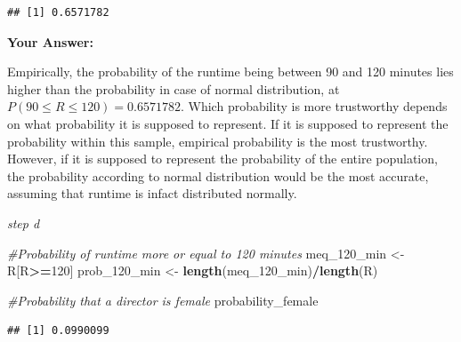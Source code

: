 \documentclass[
]{article}
\newenvironment{Shaded}{\begin{snugshade}}{\end{snugshade}}
\newcommand{\AttributeTok}[1]{\textcolor[rgb]{0.13,0.29,0.53}{#1}}
\newcommand{\CommentTok}[1]{\textcolor[rgb]{0.56,0.35,0.01}{\textit{#1}}}
\newcommand{\ConstantTok}[1]{\textcolor[rgb]{0.56,0.35,0.01}{#1}}
\newcommand{\DecValTok}[1]{\textcolor[rgb]{0.00,0.00,0.81}{#1}}
\newcommand{\FunctionTok}[1]{\textcolor[rgb]{0.13,0.29,0.53}{\textbf{#1}}}
\newcommand{\NormalTok}[1]{#1}
\newcommand{\OtherTok}[1]{\textcolor[rgb]{0.56,0.35,0.01}{#1}}
\newcommand{\SpecialCharTok}[1]{\textcolor[rgb]{0.81,0.36,0.00}{\textbf{#1}}}
\newcommand{\StringTok}[1]{\textcolor[rgb]{0.31,0.60,0.02}{#1}}
\begin{document}
\begin{verbatim}
## [1] 0.6571782
\end{verbatim}

\textbf{Your Answer:}

Empirically, the probability of the runtime being between 90 and 120
minutes lies higher than the probability in case of normal distribution,
at \(P(90 \leq R \leq 120)=0.6571782\). Which probability is more
trustworthy depends on what probability it is supposed to represent. If
it is supposed to represent the probability within this sample,
empirical probability is the most trustworthy. However, if it is
supposed to represent the probability of the entire population, the
probability according to normal distribution would be the most accurate,
assuming that runtime is infact distributed normally.

\emph{step d}

\begin{Shaded}
\begin{Highlighting}[]
\CommentTok{\#Probability of runtime more or equal to 120 minutes}
\NormalTok{meq\_120\_min }\OtherTok{\textless{}{-}}\NormalTok{ R[R}\SpecialCharTok{\textgreater{}=}\DecValTok{120}\NormalTok{]}
\NormalTok{prob\_120\_min }\OtherTok{\textless{}{-}} \FunctionTok{length}\NormalTok{(meq\_120\_min)}\SpecialCharTok{/}\FunctionTok{length}\NormalTok{(R)}

\CommentTok{\#Probability that a director is female}
\NormalTok{probability\_female}
\end{Highlighting}
\end{Shaded}

\begin{verbatim}
## [1] 0.0990099
\end{verbatim}

\begin{Shaded}
\end{Shaded}
\end{document}
